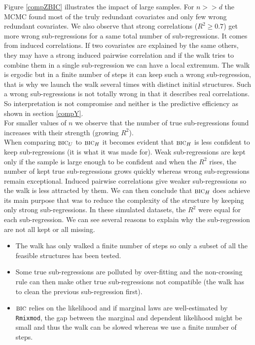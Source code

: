 \documentclass[12pt,a4paper]{report}
\begin{document}
Figure \ref{compZBIC} illustrates the impact of large samples. For $n>>d$ the MCMC found most of the truly redundant covariates and only few wrong redundant covariates. We also observe that strong correlations ($R^2\geq 0.7$) get more wrong sub-regressions for a same total number of sub-regressions. It comes from induced correlations. If two covariates are explained by the same others, they may have a strong induced pairwise correlation and if the walk tries to combine them in a single sub-regression we can have a local extremum. The walk is ergodic but in a finite number of steps it can keep such a wrong sub-regression, that is why we launch the walk several times with distinct initial structures. Such a wrong sub-regressions is not totally wrong in that it describes real correlations. So interpretation is not compromise and neither is the predictive efficiency as shown in section \ref{compY}. \\
For smaller values of $n$ we observe that the number of true sub-regressions found increases with their strength (growing $R^2$).\\
When comparing $\mbox{{\sc bic}}_U$ to $\mbox{{\sc bic}}_H$ it becomes evident that $\mbox{{\sc bic}}_H$ is less confident to keep sub-regressions (it is what it was made for). Weak sub-regressions are kept only if the sample is large enough to be confident and when the $R^2$ rises, the number of kept true sub-regressions grows quickly whereas wrong sub-regressions remain exceptional. Induced pairwise correlations give weaker sub-regressions so the walk is less attracted by them. We can then conclude that $\mbox{{\sc bic}}_H$ does achieve its main purpose that was to reduce the complexity of the structure by keeping only strong sub-regressions. In these simulated datasets, the $R^2$ were equal for each sub-regression. We can see several reasons to explain why the sub-regression are not all kept or all missing. 
\begin{itemize}
	\item The walk has only walked a finite number of steps so only a subset of all the feasible structures has been tested.
	\item Some true sub-regressions are polluted by over-fitting and the non-crossing rule can then make other true sub-regressions not compatible (the walk has to clean the previous sub-regression first).
	\item $\mbox{{\sc bic}}$ relies on the likelihood and if marginal laws are well-estimated by {\tt Rmixmod}, the gap between the marginal and dependent likelihood might be small and thus the walk can be slowed whereas we use a finite number of steps.
\end{itemize}
\end{document}
